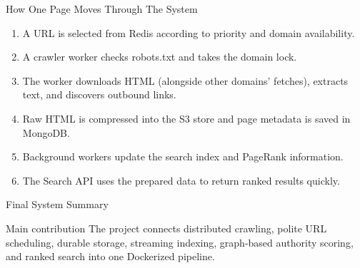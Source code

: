 \documentclass[aspectratio=169,11pt]{beamer}
\begin{document}
\begin{frame}{How One Page Moves Through The System}
  \begin{enumerate}
    \item A URL is selected from Redis according to priority and domain availability.
    \item A crawler worker checks robots.txt and takes the domain lock.
    \item The worker downloads HTML (alongside other domains' fetches), extracts text, and discovers outbound links.
    \item Raw HTML is compressed into the S3 store and page metadata is saved in MongoDB.
    \item Background workers update the search index and PageRank information.
    \item The Search API uses the prepared data to return ranked results quickly.
  \end{enumerate}
\end{frame}

\begin{frame}{Final System Summary}
  \centering

  \vspace{1.0em}
  \begin{block}{Main contribution}
    The project connects distributed crawling, polite URL scheduling, durable storage, streaming indexing, graph-based authority scoring, and ranked search into one Dockerized pipeline.
  \end{block}
\end{frame}
\end{document}
